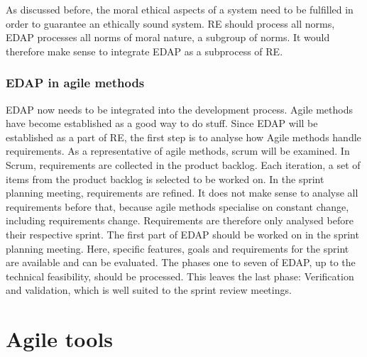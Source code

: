 As discussed before, the moral ethical aspects of a system need to be fulfilled in order to guarantee an ethically sound system. RE should process all norms, EDAP processes all norms of moral nature, a subgroup of norms. It would therefore make sense to integrate EDAP as a subprocess of RE.

\subsection*{EDAP in agile methods}
EDAP now needs to be integrated into the development process. Agile methods have become established as a good way to do stuff. Since EDAP will be established as a part of RE, the first step is to analyse how Agile methods handle requirements. As a representative of agile methods, scrum will be examined. In Scrum, requirements are collected in the product backlog. Each iteration, a set of items from the product backlog is selected to be worked on. In the sprint planning meeting, requirements are refined. It does not make sense to analyse all requirements before that, because agile methods specialise on constant change, including requirements change.\cite{sillitti2005requirements:3} Requirements are therefore only analysed before their respective sprint. The first part of EDAP should be worked on in the sprint planning meeting. Here, specific features, goals and requirements for the sprint are available and can be evaluated. The phases one to seven of EDAP, up to the technical feasibility, should be processed. This leaves the last phase: Verification and validation, which is well suited to the sprint review meetings.

\chapter{Agile tools}
